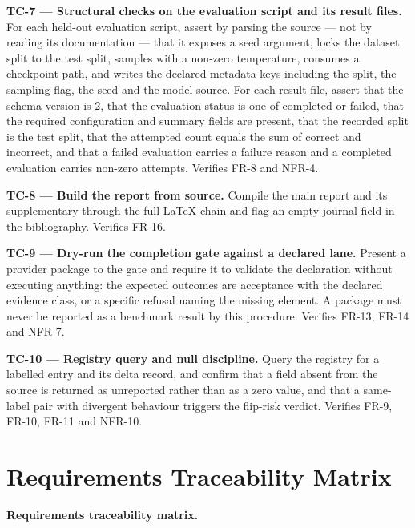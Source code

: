 \documentclass[12pt,a4paper]{report}
\begin{document}
\textbf{TC-7 --- Structural checks on the evaluation script and its
result files.} For each held-out evaluation script, assert by parsing
the source --- not by reading its documentation --- that it exposes a
seed argument, locks the dataset split to the test split, samples with a
non-zero temperature, consumes a checkpoint path, and writes the
declared metadata keys including the split, the sampling flag, the seed
and the model source. For each result file, assert that the schema
version is 2, that the evaluation status is one of completed or failed,
that the required configuration and summary fields are present, that the
recorded split is the test split, that the attempted count equals the
sum of correct and incorrect, and that a failed evaluation carries a
failure reason and a completed evaluation carries non-zero attempts.
Verifies FR-8 and NFR-4.

\textbf{TC-8 --- Build the report from source.} Compile the main report
and its supplementary through the full LaTeX chain and flag an empty
journal field in the bibliography. Verifies FR-16.

\textbf{TC-9 --- Dry-run the completion gate against a declared lane.}
Present a provider package to the gate and require it to validate the
declaration without executing anything: the expected outcomes are
acceptance with the declared evidence class, or a specific refusal
naming the missing element. A package must never be reported as a
benchmark result by this procedure. Verifies FR-13, FR-14 and NFR-7.

\textbf{TC-10 --- Registry query and null discipline.} Query the
registry for a labelled entry and its delta record, and confirm that a
field absent from the source is returned as unreported rather than as a
zero value, and that a same-label pair with divergent behaviour triggers
the flip-risk verdict. Verifies FR-9, FR-10, FR-11 and NFR-10.

\section{Requirements Traceability
Matrix}\label{requirements-traceability-matrix}

\textbf{Requirements traceability matrix.}
\end{document}
